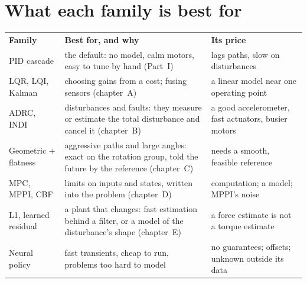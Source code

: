 
\section{What each family is best for}

\begin{result}
\small
\begin{tabularx}{\linewidth}{@{}>{\raggedright\arraybackslash}p{6.6em}>{\raggedright\arraybackslash}X>{\raggedright\arraybackslash}X@{}}
\textbf{Family} & \textbf{Best for, and why} & \textbf{Its price}\\[2pt]
PID cascade & the default: no model, calm motors, easy to tune by hand (Part~I) & lags paths, slow on disturbances\\
LQR, LQI, Kalman & choosing gains from a cost; fusing sensors (chapter~A) & a linear model near one operating point\\
ADRC, INDI & disturbances and faults: they measure or estimate the total disturbance and cancel it (chapter~B) & a good accelerometer, fast actuators, busier motors\\
Geometric + flatness & aggressive paths and large angles: exact on the rotation group, told the future by the reference (chapter~C) & needs a smooth, feasible reference\\
MPC, MPPI, CBF & limits on inputs and states, written into the problem (chapter~D) & computation; a model; MPPI's noise\\
L1, learned residual & a plant that changes: fast estimation behind a filter, or a model of the disturbance's shape (chapter~E) & a force estimate is not a torque estimate\\
Neural policy & fast transients, cheap to run, problems too hard to model & no guarantees; offsets; unknown outside its data\\
\end{tabularx}
\end{result}

